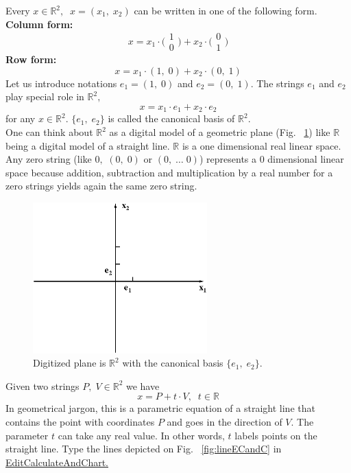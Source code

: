 \documentclass[color=black,11pt]{elegantpaper}
\begin{document}
Every $x \in \mathbb{R}^2, \;\;x=(x_1,\;x_2)$ can be written in one of the following form.\\
{\bf Column form:}
$$
x=x_1 \cdot \Big(\begin{array}{c}
                 1\\ 
                 0
            \end{array}\Big) + x_2 \cdot \Big(\begin{array}{c}
                                         0\\
                                         1
                                       \end{array}\Big)
$$
{\bf Row form:}
$$
x= x_1\cdot (1,\;0) + x_2 \cdot (0,\; 1)
$$
Let us introduce notations $e_1 =(1,\;0)$ and $e_2 = (0,\;1).$
The strings $e_1$ and $e_2 $ play special role in $\mathbb{R}^2,$
$$
x = x_1 \cdot e_1 + x_2 \cdot e_2
$$
for any $x\in \mathbb{R}^2.$ $\{e_1,\;e_2\}$ is called the canonical basis of $\mathbb{R}^2.$ \\
One can think about $\mathbb{R}^2$ as a digital model of a geometric plane (Fig. ~\ref{fig:plane}) like $\mathbb{R}$ being a digital model of a straight line. $\mathbb{R}$ is a one dimensional real linear space. Any zero string  (like $0,$ $(0,\;0)$ or $(0,\;\dots\;0)$) represents a $0$ dimensional linear space because addition, subtraction and multiplication by a real number for a zero strings yields again the same zero string.

\begin{figure}[htbp]
  \centering
  \includegraphics[width=0.6\textwidth]{xfig_stuff/plane.eps}
  \caption{Digitized plane is $\mathbb{R}^2$ with the canonical basis $\{e_1,\;e_2\}.$}
  \label{fig:plane}
\end{figure}

Given two strings $P,\;V\in \mathbb{R}^2$ we have
\begin{equation}
\label{eq:parametric_straight_line}
x = P+ t\cdot V,\;\;t\in \mathbb{R}
\end{equation} 
In geometrical jargon, this is a parametric equation of a straight line that contains the point with coordinates $P$ and goes in the direction of $V.$ The parameter $t$ can take any real value. In other words, $t$ labels points on the straight line. Type the lines depicted on Fig. ~\ref{fig:lineECandC} in \href{https://github.com/mathhobbit/EditCalculateAndChart/releases}{EditCalculateAndChart.}
\end{document}
